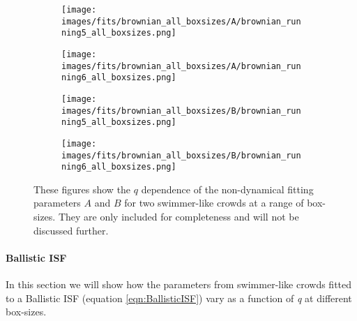\documentclass[10pt]{article}
\begin{document}
\begin{figure}[H]
\begin{subfigure}[t]{.5\textwidth}
  \centering
 \texttt{[image: images/fits/brownian\_all\_boxsizes/A/brownian\_running5\_all\_boxsizes.png]}
  \caption{}
\end{subfigure}%
\hfill
\begin{subfigure}[t]{.5\textwidth}
  \centering
  \texttt{[image: images/fits/brownian\_all\_boxsizes/A/brownian\_running6\_all\_boxsizes.png]}
  \caption{}
\end{subfigure}
\label{fig:running_brownian_fits_A_all_boxsizes}
\par\bigskip
\begin{subfigure}[t]{.5\textwidth}
  \centering
 \texttt{[image: images/fits/brownian\_all\_boxsizes/B/brownian\_running5\_all\_boxsizes.png]}
  \caption{}
\end{subfigure}%
\hfill
\begin{subfigure}[t]{.5\textwidth}
  \centering
  \texttt{[image: images/fits/brownian\_all\_boxsizes/B/brownian\_running6\_all\_boxsizes.png]}
  \caption{}
\end{subfigure}
\caption{These figures show the $q$ dependence of the non-dynamical fitting parameters $A$ and $B$ for two swimmer-like crowds at a range of box-sizes. They are only included for completeness and will not be discussed further.}
\label{fig:running_brownian_fits_tauc_B_boxsizes}
\end{figure}


\paragraph{Ballistic ISF} In this section we will show how the parameters from swimmer-like crowds fitted to a Ballistic ISF (equation \ref{eqn:BallisticISF}) vary as a function of \textit{q} at different box-sizes. 
\end{document}
